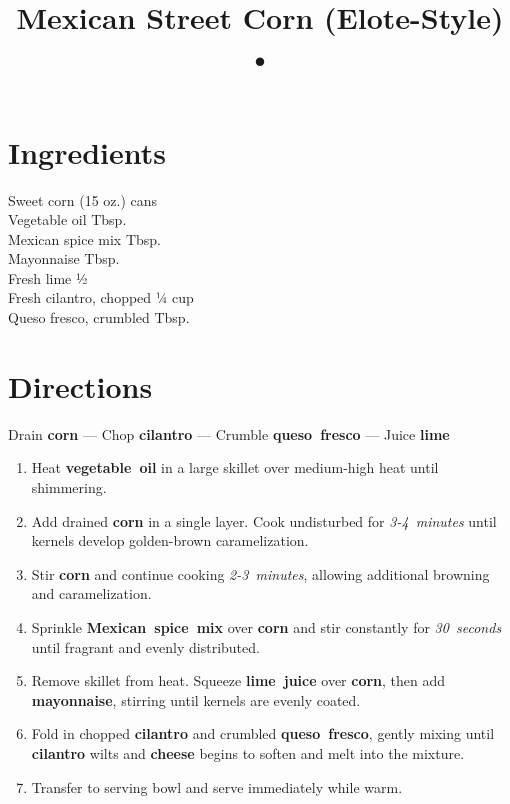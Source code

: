 \documentclass[11pt,letterpaper]{article}
\title{Mexican Street Corn (Elote-Style) •}
\author{}
\date{}
\begin{document}
\maketitle
\thispagestyle{empty}

\section*{Ingredients}
\setlength{\columnsep}{20pt}
\begin{multicols}{2}
\noindent
    Sweet corn  (15 oz.) cans \\
    Vegetable oil  Tbsp. \\
    Mexican spice mix  Tbsp. \\
    Mayonnaise  Tbsp. \\
    \columnbreak
    Fresh lime \dotfill ½ \\
    Fresh cilantro, chopped \dotfill ¼ cup \\
    Queso fresco, crumbled  Tbsp. \\
\end{multicols}

\section*{Directions}

\noindent
Drain \textbf{corn} ---
Chop \textbf{cilantro} ---
Crumble \textbf{queso~fresco} ---
Juice \textbf{lime}

\begin{enumerate}
    \item Heat \textbf{vegetable~oil} in a large skillet over medium-high heat until shimmering.
    
    \item Add drained \textbf{corn} in a single layer. Cook undisturbed for \textit{3-4~minutes} until kernels develop golden-brown caramelization.
    
    \item Stir \textbf{corn} and continue cooking \textit{2-3~minutes}, allowing additional browning and caramelization.
    
    \item Sprinkle \textbf{Mexican~spice~mix} over \textbf{corn} and stir constantly for \textit{30~seconds} until fragrant and evenly distributed.
    
    \item Remove skillet from heat. Squeeze \textbf{lime~juice} over \textbf{corn}, then add \textbf{mayonnaise}, stirring until kernels are evenly coated.
    
    \item Fold in chopped \textbf{cilantro} and crumbled \textbf{queso~fresco}, gently mixing until \textbf{cilantro} wilts and \textbf{cheese} begins to soften and melt into the mixture.
    
    \item Transfer to serving bowl and serve immediately while warm.
\end{enumerate}
\end{document}
